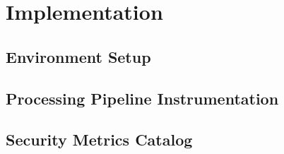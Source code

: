 \section{Implementation}\label{sec_results}


\subsection{Environment Setup}\label{sec:results:dev_env}



\subsection{Processing Pipeline Instrumentation}\label{sec:results:graph_reduce}
\label{sec:results:tmatrix_graphs}
\label{sec:results:graph_manip}


\subsection{Security Metrics Catalog}\label{sec:results:secmet_impl}


\label{sec:results:validation}
\label{sec:results:validation}

% 